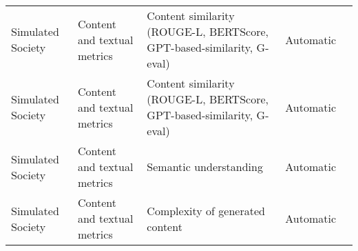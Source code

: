 \begin{small}
\begin{center}
\begin{longtable}{@{}p{}p{}p{}p{}p{}@{}}
Simulated Society        & Content and textual metrics         & Content similarity (ROUGE-L, BERTScore, GPT-based-similarity, G-eval)                                                                                                                                       & Automatic & \cite{chen2024towards}                                                                                                                                                                                                                                                                                                                                                                                       \\
Simulated Society        & Content and textual metrics         & Content similarity (ROUGE-L, BERTScore, GPT-based-similarity, G-eval)                                                                                                                                       & Automatic & \cite{mishra-etal-2023-e}                                                                                                                                                                                                                                                                                                                                                                                             \\
Simulated Society        & Content and textual metrics         & Semantic understanding                                                                                                                                                                                      & Automatic & \cite{gu2024agentgroupchatinteractivegroupchat}                                                                                                                                                                                                                                                                                                                                                                                        \\
Simulated Society        & Content and textual metrics         & Complexity of generated content                                                                                                                                                                             & Automatic & \cite{10.1145/3570945.3607303}                                                                                                                                                                                                                                                                                                                                                                              \\

\end{longtable}
\end{center}
\end{small}
